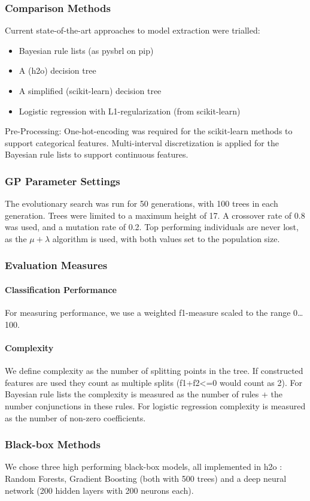 \subsubsection{Comparison Methods}
Current state-of-the-art approaches to model extraction were trialled:
\begin{itemize}
\item Bayesian rule lists \cite{Yang:bayrule} (as pysbrl on pip)
\item A (h2o) decision tree \cite{H2o}
\item A simplified (scikit-learn) \cite{Pedregosa:sickit} decision tree \cite{skimltree}
\item Logistic regression with L1-regularization (from scikit-learn)
\end{itemize}
Pre-Processing: One-hot-encoding was required for the scikit-learn methods to support categorical features. Multi-interval discretization is applied for the Bayesian rule lists to support continuous features.
\subsubsection{GP Parameter Settings}
The evolutionary search was run for 50 generations, with 100 trees in each generation. Trees were limited to a maximum height of 17. A crossover rate of 0.8 was used, and a mutation rate of 0.2. Top performing individuals are never lost, as the $\mu + \lambda$ algorithm \cite{Beyer:evo_strat} is used, with both values set to the population size.
\subsubsection{Evaluation Measures}
\paragraph{Classification Performance}
For measuring performance, we use a weighted f1-measure scaled to the range 0\ldots100.
\paragraph{Complexity}
We define complexity as the number of splitting points in the tree. If constructed features are used they count as multiple splits (f1+f2<=0 would count as 2). For Bayesian rule lists the complexity is measured as the number of rules + the number conjunctions in these rules. For logistic regression complexity is measured as the number of non-zero coefficients.
\subsubsection{Black-box Methods}
We chose three high performing black-box models, all implemented in h2o \cite{H2o}: Random Forests, Gradient Boosting (both with 500 trees) and a deep neural network (200 hidden layers with 200 neurons each).

